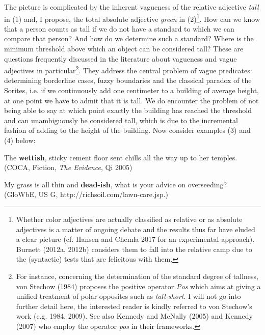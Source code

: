 \documentclass[output=paper
,modfonts
,nonflat]{langsci/langscibook}
\begin{document}
The picture is complicated by the inherent vagueness of the relative adjective  \textit{tall} in (1) and, I propose, the total absolute adjective  \textit{green} in (2)\footnote{Whether color adjectives are actually classified as relative or as absolute adjectives is a matter of ongoing debate and the results thus far have eluded a clear picture (cf. Hansen and Chemla 2017 for an experimental approach). Burnett (2012a, 2012b) considers them to fall into the relative camp due to the (syntactic) tests that are felicitous with them.}. How can we know that a person counts as tall if we do not have a standard to which we can compare that person? And how do we determine such a standard? Where is the minimum threshold above which an object can be considered tall? These are questions frequently discussed in the literature about vagueness and vague adjectives in particular\footnote{For instance, concerning the determination of the standard degree of tallness, von Stechow (1984) proposes the positive operator \textit{Pos} which aims at giving a unified treatment of polar opposites such as \textit{tall-short}. I will not go into further detail here, the interested reader is kindly referred to von Stechow's work (e.g. 1984, 2009). See also Kennedy and McNally (2005) and Kennedy (2007) who employ the operator \textit{pos} in their frameworks.}. They address the central problem of vague predicates: determining borderline cases, fuzzy boundaries and the classical paradox of the Sorites, i.e. if we continuously add one centimeter to a building of average height, at one point we have to admit that it is tall. We do encounter the problem of not being able to say at which point exactly the building has reached the threshold and can unambiguously be considered tall, which is due to the incremental fashion of adding to the height of the building.
Now consider examples (3) and (4) below:

\begin{examples}
	\item The \textbf{wettish}, sticky cement floor sent chills all the way up to her temples. (COCA, Fiction,  \textit{The Evidence}, Qi 2005)
	\item My grass is all thin and \textbf{dead-ish}, what is your advice on overseeding? (GloWbE, US G, http://richsoil.com/lawn-care.jsp.)
\end{examples}
\end{document}
